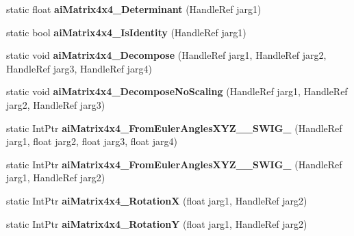 \begin{DoxyCompactItemize}
\item 
\hypertarget{class_assimp_p_i_n_v_o_k_e_a7d9dc5b334d84a7e7997d378c0dbdb3b}{static float {\bfseries ai\+Matrix4x4\+\_\+\+Determinant} (Handle\+Ref jarg1)}\label{class_assimp_p_i_n_v_o_k_e_a7d9dc5b334d84a7e7997d378c0dbdb3b}

\item 
\hypertarget{class_assimp_p_i_n_v_o_k_e_a78b8969e66a3de1645f20ab12fc7ecfe}{static bool {\bfseries ai\+Matrix4x4\+\_\+\+Is\+Identity} (Handle\+Ref jarg1)}\label{class_assimp_p_i_n_v_o_k_e_a78b8969e66a3de1645f20ab12fc7ecfe}

\item 
\hypertarget{class_assimp_p_i_n_v_o_k_e_a06b35b4563e5e2b87e325ddb79b9a273}{static void {\bfseries ai\+Matrix4x4\+\_\+\+Decompose} (Handle\+Ref jarg1, Handle\+Ref jarg2, Handle\+Ref jarg3, Handle\+Ref jarg4)}\label{class_assimp_p_i_n_v_o_k_e_a06b35b4563e5e2b87e325ddb79b9a273}

\item 
\hypertarget{class_assimp_p_i_n_v_o_k_e_ab426c20a7a2c7d150d0958d283bfd5e2}{static void {\bfseries ai\+Matrix4x4\+\_\+\+Decompose\+No\+Scaling} (Handle\+Ref jarg1, Handle\+Ref jarg2, Handle\+Ref jarg3)}\label{class_assimp_p_i_n_v_o_k_e_ab426c20a7a2c7d150d0958d283bfd5e2}

\item 
\hypertarget{class_assimp_p_i_n_v_o_k_e_a51c739d19f2a2d24ed15b5cda9426d5f}{static Int\+Ptr {\bfseries ai\+Matrix4x4\+\_\+\+From\+Euler\+Angles\+X\+Y\+Z\+\_\+\+\_\+\+S\+W\+I\+G\+\_} (Handle\+Ref jarg1, float jarg2, float jarg3, float jarg4)}\label{class_assimp_p_i_n_v_o_k_e_a51c739d19f2a2d24ed15b5cda9426d5f}

\item 
\hypertarget{class_assimp_p_i_n_v_o_k_e_aa9590183a4f8fb8d1352ae6430887d76}{static Int\+Ptr {\bfseries ai\+Matrix4x4\+\_\+\+From\+Euler\+Angles\+X\+Y\+Z\+\_\+\+\_\+\+S\+W\+I\+G\+\_} (Handle\+Ref jarg1, Handle\+Ref jarg2)}\label{class_assimp_p_i_n_v_o_k_e_aa9590183a4f8fb8d1352ae6430887d76}

\item 
\hypertarget{class_assimp_p_i_n_v_o_k_e_a9a3b8a7d7f8dea42e15997ccf68d31bf}{static Int\+Ptr {\bfseries ai\+Matrix4x4\+\_\+\+Rotation\+X} (float jarg1, Handle\+Ref jarg2)}\label{class_assimp_p_i_n_v_o_k_e_a9a3b8a7d7f8dea42e15997ccf68d31bf}

\item 
\hypertarget{class_assimp_p_i_n_v_o_k_e_a2475e5909e6f49bf5bc189d69f023206}{static Int\+Ptr {\bfseries ai\+Matrix4x4\+\_\+\+Rotation\+Y} (float jarg1, Handle\+Ref jarg2)}\label{class_assimp_p_i_n_v_o_k_e_a2475e5909e6f49bf5bc189d69f023206}


\end{DoxyCompactItemize}
